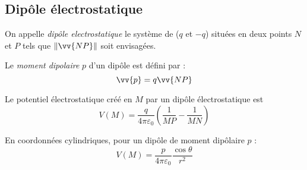 \documentclass[11pt,a4paper,fleqn,pdftex]{report}
\begin{document}
\subsection{Dipôle électrostatique} %
\label{sub:dipole_electrostatique}
\begin{dfn}
   On appelle \emph{dipôle electrostatique} le système de  ($q$ et $-q$) situées en deux points $N$ et $P$ tels que $\|\vv{NP}\|$ soit  envisagées.
\end{dfn}
\begin{dfn}
   \begin{minipage}{0.5\textwidth}
   Le \emph{moment dipolaire} $p$ d'un dipôle est défini par :
    \begin{equation}
      \vv{p} = q\vv{NP}
    \end{equation}
   \end{minipage}
   \begin{minipage}{0.5\textwidth}
      \begin{center}
      \end{center}
   \end{minipage}
\end{dfn}
\begin{theorem}
   Le potentiel électrostatique créé en $M$ par un dipôle électrostatique est
   \begin{equation}
   V(M) = \dfrac{q}{4\pi\varepsilon_0}\left( \dfrac{1}{MP} - \dfrac{1}{MN} \right) 
   \end{equation}
\end{theorem}
\begin{theorem}
    En coordonnées cylindriques, pour un dipôle de moment dipôlaire $p$ :
   \begin{equation}
   V(M) = \dfrac{p}{4\pi\varepsilon_0} \dfrac{\cos \theta}{r^2}
   \end{equation}
\end{theorem}
\end{document}
